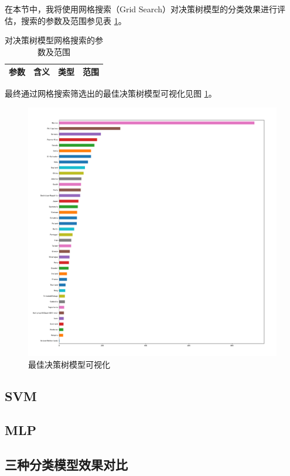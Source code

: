 \documentclass[12pt,a4paper]{article}
\theoremstyle{definition}
\begin{document}
在本节中，我将使用网格搜索（Grid Search）对决策树模型的分类效果进行评估，搜索的参数及范围参见表 \ref{tab:dt-gs-para}。

\begin{table}[H]
	\renewcommand\arraystretch{1.35}
	\caption{对决策树模型网格搜索的参数及范围}
	\label{tab:dt-gs-para}
	\centering
	
	\begin{tabular}{c|c|c|c}
		\centering
		参数 &  含义 & 类型& 范围 \\
		\hline
		\hline
		

	\end{tabular}
\end{table}

最终通过网格搜索筛选出的最佳决策树模型可视化见图 \ref{fig:dt-best-vis}。

\begin{figure}[H]
	\centering
	\includegraphics[width=0.75\linewidth]{img/native_country_dis2.pdf}
	\caption{最佳决策树模型可视化}
	\label{fig:dt-best-vis}
\end{figure}

\subsection{SVM}

\subsection{MLP}

\subsection{三种分类模型效果对比}
\end{document}
